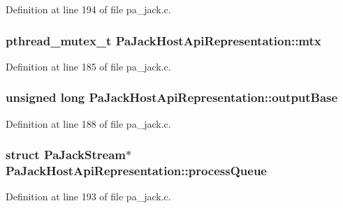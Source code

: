 Definition at line 194 of file pa\+\_\+jack.\+c.

\subsubsection[{\texorpdfstring{mtx}{mtx}}]{\setlength{\rightskip}{0pt plus 5cm}pthread\+\_\+mutex\+\_\+t Pa\+Jack\+Host\+Api\+Representation\+::mtx}\hypertarget{struct_pa_jack_host_api_representation_a46492bb237e9f6edd9de5936a9cb62e3}{}\label{struct_pa_jack_host_api_representation_a46492bb237e9f6edd9de5936a9cb62e3}


Definition at line 185 of file pa\+\_\+jack.\+c.

\subsubsection[{\texorpdfstring{output\+Base}{outputBase}}]{\setlength{\rightskip}{0pt plus 5cm}unsigned long Pa\+Jack\+Host\+Api\+Representation\+::output\+Base}\hypertarget{struct_pa_jack_host_api_representation_aa341e520075c927035d08185496ad49a}{}\label{struct_pa_jack_host_api_representation_aa341e520075c927035d08185496ad49a}


Definition at line 188 of file pa\+\_\+jack.\+c.

\subsubsection[{\texorpdfstring{process\+Queue}{processQueue}}]{\setlength{\rightskip}{0pt plus 5cm}struct {\bf Pa\+Jack\+Stream}$\ast$ Pa\+Jack\+Host\+Api\+Representation\+::process\+Queue}\hypertarget{struct_pa_jack_host_api_representation_a1284c04d683a42a143e15d81485df227}{}\label{struct_pa_jack_host_api_representation_a1284c04d683a42a143e15d81485df227}


Definition at line 193 of file pa\+\_\+jack.\+c.

